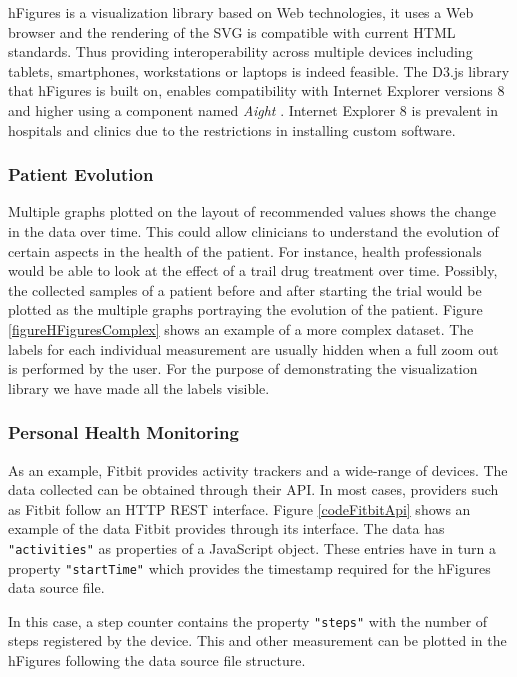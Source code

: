 \documentclass[twocolumn]{bmcart}%
\begin{document}
hFigures is a visualization library based on Web technologies, it uses a Web browser and the rendering of the SVG is compatible with current HTML standards. Thus providing interoperability across multiple devices including tablets, smartphones, workstations or laptops is indeed feasible. The D3.js library that hFigures is built on, enables compatibility with Internet Explorer versions 8 and higher using a component named \textit{Aight} \cite{aight}. Internet Explorer 8 is prevalent in hospitals and clinics due to the restrictions in installing custom software.

\subsubsection*{Patient Evolution}

Multiple graphs plotted on the layout of recommended values shows the change in the data over time. This could allow clinicians to understand the evolution of certain aspects in the health of the patient. For instance, health professionals would be able to look at the effect of a trail drug treatment over time. Possibly, the collected samples of a patient before and after starting the trial would be plotted as the multiple graphs portraying the evolution of the patient. Figure \ref{figureHFiguresComplex} shows an example of a more complex dataset. The labels for each individual measurement are usually hidden when a full zoom out is performed by the user. For the purpose of demonstrating the visualization library we have made all the labels visible. 


\subsubsection*{Personal Health Monitoring}

As an example, Fitbit provides activity trackers and a wide-range of devices. The data collected can be obtained through their API. In most cases, providers such as Fitbit follow an HTTP REST interface. Figure \ref{codeFitbitApi} shows an example of the data Fitbit provides through its interface. The data has \texttt{"activities"} as properties of a JavaScript object. These entries have in turn a property \texttt{"startTime"} which provides the timestamp required for the hFigures data source file.

In this case, a step counter contains the property \texttt{"steps"} with the number of steps registered by the device. This and other measurement can be plotted in the hFigures following the data source file structure.
\end{document}
